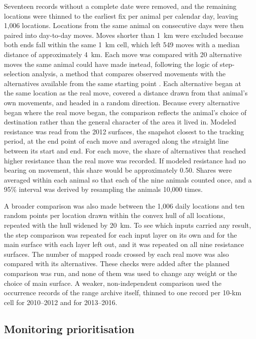 Seventeen records without a complete date were removed, and the remaining locations were thinned to the earliest fix per animal per calendar day, leaving 1,006 locations. Locations from the same animal on consecutive days were then paired into day-to-day moves. Moves shorter than 1~km were excluded because both ends fall within the same 1~km cell, which left 549 moves with a median distance of approximately 4~km. Each move was compared with 20 alternative moves the same animal could have made instead, following the logic of step-selection analysis, a method that compares observed movements with the alternatives available from the same starting point \parencite{fortin2005wolves, thurfjell2014ssf}. Each alternative began at the same location as the real move, covered a distance drawn from that animal's own movements, and headed in a random direction. Because every alternative began where the real move began, the comparison reflects the animal's choice of destination rather than the general character of the area it lived in. Modeled resistance was read from the 2012 surfaces, the snapshot closest to the tracking period, at the end point of each move and averaged along the straight line between its start and end. For each move, the share of alternatives that reached higher resistance than the real move was recorded. If modeled resistance had no bearing on movement, this share would be approximately 0.50. Shares were averaged within each animal so that each of the nine animals counted once, and a 95\% interval was derived by resampling the animals 10,000 times.

A broader comparison was also made between the 1,006 daily locations and ten random points per location drawn within the convex hull of all locations, repeated with the hull widened by 20~km. To see which inputs carried any result, the step comparison was repeated for each input layer on its own and for the main surface with each layer left out, and it was repeated on all nine resistance surfaces. The number of mapped roads crossed by each real move was also compared with its alternatives. These checks were added after the planned comparison was run, and none of them was used to change any weight or the choice of main surface. A weaker, non-independent comparison used the occurrence records of the range archive itself, thinned to one record per 10-km cell for 2010--2012 and for 2013--2016.

\subsection{Monitoring prioritisation}
\label{sec:mcda}

